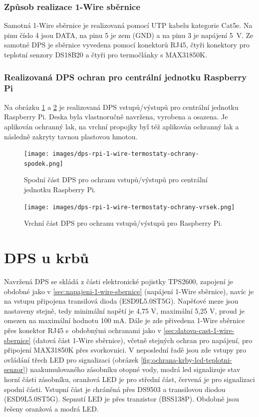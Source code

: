 \subsubsection{Způsob realizace 1-Wire sběrnice}
Samotná 1-Wire sběrnice je realizovaná pomocí UTP kabelu kategorie Cat5e. Na pinu číslo 4 jsou DATA, na pinu 5 je zem (GND) a na pinu 3 je napájení 5~V. Ze samotné DPS je sběrnice vyvedena pomocí konektorů RJ45, čtyři konektory pro teplotní senzory DS18B20 a čtyři pro termočlánky s MAX31850K.

\subsubsection{Realizovaná DPS ochran pro centrální jednotku Raspberry Pi}
Na obrázku \ref{fig:dps-rpi-1-wire-termostaty-ochrany-spodek} a \ref{fig:dps-rpi-1-wire-termostaty-ochrany-vrsek} je realizovaná DPS vstupů/výstupů pro centrální jednotku Raspberry Pi. Deska byla vlastnoručně navržena, vyrobena a osazena. Je aplikován ochranný lak, na vrchní propojky byl též aplikován ochranný lak a následně zakryty tavnou plastovou hmotou.

\begin{figure}[H]
    \centering
    \texttt{[image: images/dps-rpi-1-wire-termostaty-ochrany-spodek.png]}
    \caption{Spodní část DPS pro ochranu vstupů/výstupů pro centrální jednotku Raspberry Pi.}
    \label{fig:dps-rpi-1-wire-termostaty-ochrany-spodek}
\end{figure}

\begin{figure}[H]
    \centering
    \texttt{[image: images/dps-rpi-1-wire-termostaty-ochrany-vrsek.png]}
    \caption{Vrchní část DPS pro ochranu vstupů/výstupů pro Raspberry Pi.}
    \label{fig:dps-rpi-1-wire-termostaty-ochrany-vrsek}
\end{figure}

\section{DPS u krbů}
Navržená DPS se skládá z části elektronické pojistky TPS2600, zapojení je obdobné jako v \ref{sec:napajeni-1-wire-sbernice} (napájení 1-Wire sběrnice), navíc je na vstupu připojena transilová dioda (ESD9L5.0ST5G). Napěťové meze jsou nastaveny stejně, tedy minimální napětí je 4,75 V, maximální 5,25 V, proud je omezen na maximální hodnotu 100 mA. Dále je zde přivedena 1-Wire sběrnice přes konektor RJ45 s~obdobnými ochranami jako v \ref{sec:datova-cast-1-wire-sbernice} (datová část 1-Wire sběrnice), včetně stejných ochran pro napájení, pro připojení MAX31850K přes svorkovnici. V neposlední řadě jsou zde vstupy pro ovládání třech LED pro signalizaci (obrázek \ref{fig:ochrana-krby-lcd-teplotni-senzor}) naakumulovaného zásobníku otopné vody, modrá led signalizuje stav horní části zásobníku, oranžová LED je pro střední část, červená je pro signalizaci spodní části. Vstupní část je chráněná přes DS9503 a transilovou diodou (ESD9L5.0ST5G). Sepnutí LED je přes tranzistor (BSS138P). Obdobně jsou řešeny oranžová a modrá LED.

